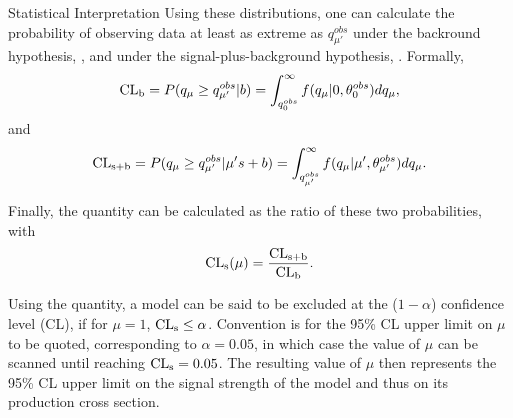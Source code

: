 \begin{section}{Statistical Interpretation}
Using these distributions, one can calculate the probability of observing data at least as extreme as $q^{obs}_{\mu'}$ under the backround hypothesis, \CLb, and under the signal-plus-background hypothesis, \CLsb.
Formally,
\begin{align}
\textrm{CL}_\textrm{b} = P(q_{\mu} \geq q^{obs}_{\mu'}|b) = \int^{\infty}_{q^{obs}_{0}} f(q_{\mu}|0,\theta^{obs}_{0}) dq_{\mu},
\end{align}
and
\begin{align}
\textrm{CL}_\textrm{s+b} = P(q_{\mu} \geq q^{obs}_{\mu'}|\mu's+b) = \int^{\infty}_{q^{obs}_{\mu'}} f(q_{\mu}|\mu',\theta^{obs}_{\mu'}) dq_{\mu}.
\end{align}
\end{section}
Finally, the \CLs quantity can be calculated as the ratio of these two probabilities, with
\begin{align}
\textrm{CL}_\textrm{s}(\mu) = \frac{\textrm{CL}_\textrm{s+b}}{\textrm{CL}_\textrm{b}}.
\end{align}

Using the \CLs quantity, a model can be said to be excluded at the ($1 - \alpha$) confidence level (CL), if for $\mu = 1$, $\textrm{CL}_\textrm{s} \leq \alpha$.
Convention is for the 95\% CL upper limit on $\mu$ to be quoted, corresponding to $\alpha = 0.05$, in which case the value of $\mu$ can be scanned until reaching $\textrm{CL}_\textrm{s} = 0.05$.
The resulting value of $\mu$ then represents the 95\% CL upper limit on the signal strength of the model and thus on its production cross section.

